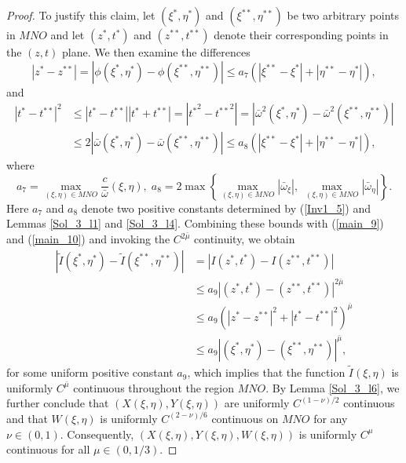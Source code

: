 \documentclass[3p,11pt]{elsarticle}
\numberwithin{equation}{section}
\begin{document}
\begin{proof}
   To justify this claim, let $(\xi^*,\eta^{*})$ and $(\xi^{**},\eta^{**})$ be two arbitrary points in $MNO$ and let $(z^{*},t^{*})$ and $(z^{**},t^{**})$ denote their corresponding points in the $(z,t)$ plane. We then examine the differences
   \begin{equation}\label{main_9}
       |z^{*}-z^{**}|=|\phi(\xi^*,\eta^{*})-\phi(\xi^{**},\eta^{**})|\leq a_7(|\xi^{**}-\xi^{*}|+|\eta^{**}-\eta^{*}|),
   \end{equation}
   and
   \begin{equation}\label{main_10}
       \begin{split}
           |t^{*}-t^{**}|^2 &\leq |t^{*}-t^{**}||t^{*}+t^{**}|=|{t^{*}}^2-{t^{**}}^2|=|\bar{\omega}^2(\xi^{*},\eta^{*})-\bar{\omega}^2(\xi^{**},\eta^{**})|\\
           &\leq 2 |\bar{\omega}(\xi^{*},\eta^{*})-\bar{\omega}(\xi^{**},\eta^{**})|\leq a_8(|\xi^{**}-\xi^{*}|+|\eta^{**}-\eta^{*}|),
       \end{split}
   \end{equation}
   where
   \begin{equation*}\label{main_11}
      a_7=\max_{(\xi,\eta)\in MNO} \frac{c}{\bar\omega}(\xi,\eta), \; a_8=2\max\left\{\max_{(\xi,\eta)\in MNO} |\bar\omega_\xi|, \; \max_{(\xi,\eta)\in MNO} |\bar\omega_\eta|\right\}.
   \end{equation*}
   Here $a_7$ and $a_8$ denote two positive constants determined by (\ref{Inv1_5}) and Lemmas \ref{Sol_3_l1} and \ref{Sol_3_l4}. Combining these bounds with (\ref{main_9}) and (\ref{main_10}) and invoking the $C^{2\bar\mu}$ continuity, we obtain
   \begin{equation*}\label{main_12}
       \begin{split}
           |\tilde I(\xi^{*},\eta^{*})-\tilde I(\xi^{**},\eta^{**})|&=|I(z^{*},t^{*})-I(z^{**},t^{**})|\\
           &\leq a_9|(z^{*},t^{*})-(z^{**},t^{**})|^{2\bar\mu}\\
           &\leq a_9 \left(|z^{*}-z^{**}|^2+|t^{*}-t^{**}|^2 \right)^{\bar\mu}\\
           &\leq a_9|(\xi^{*},\eta^{*})-(\xi^{**},\eta^{**})|^{\bar\mu},
       \end{split}
   \end{equation*}
   for some uniform positive constant $a_9$, which implies that the function $\tilde I(\xi,\eta)$ is uniformly $C^{\bar\mu}$ continuous throughout the region $MNO$. By Lemma \ref{Sol_3_l6}, we further conclude that $( X(\xi,\eta),  Y(\xi,\eta))$ are uniformly $C^{(1-\nu)/2}$ continuous and that $W(\xi,\eta)$ is uniformly $C^{(2-\nu)/6}$ continuous on $MNO$ for any $\nu\in(0,1)$. Consequently, $( X(\xi,\eta),  Y(\xi,\eta), W(\xi,\eta))$ is uniformly $C^{\mu}$ continuous for all $\mu\in(0,1/3)$.


\end{proof}
\end{document}

